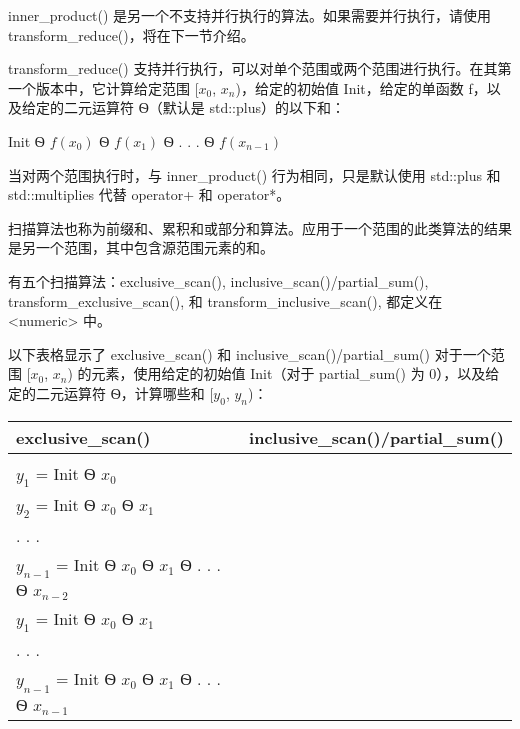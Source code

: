 inner\_product() 是另一个不支持并行执行的算法。如果需要并行执行，请使用 transform\_reduce()，将在下一节介绍。


transform\_reduce() 支持并行执行，可以对单个范围或两个范围进行执行。在其第一个版本中，它计算给定范围 [$x_0$, $x_n$)，给定的初始值 Init，给定的单函数 f，以及给定的二元运算符 Ѳ（默认是 std::plus）的以下和：

Init Ѳ $f(x_0)$ Ѳ $f(x_1)$ Ѳ . . . Ѳ $f(x_{n−1})$

当对两个范围执行时，与 inner\_product() 行为相同，只是默认使用 std::plus 和 std::multiplies 代替 operator+ 和 operator*。


扫描算法也称为前缀和、累积和或部分和算法。应用于一个范围的此类算法的结果是另一个范围，其中包含源范围元素的和。

有五个扫描算法：exclusive\_scan(), inclusive\_scan()/partial\_sum(), transform\_exclusive\_scan(), 和 transform\_inclusive\_scan(), 都定义在 <numeric> 中。

以下表格显示了 exclusive\_scan() 和 inclusive\_scan()/partial\_sum() 对于一个范围 [$x_0$, $x_n$) 的元素，使用给定的初始值 Init（对于 partial\_sum() 为 0），以及给定的二元运算符 Ѳ，计算哪些和 [$y_0$, $y_n$)：

\begin{longtable}{|l|l|}
\hline
\textbf{exclusive\_scan()} &
\textbf{inclusive\_scan()/partial\_sum()} \\ \hline
\endfirsthead
%
\endhead
%
\begin{tabular}[c]{@{}l@{}}$y_0$ = Init\\ $y_1$ = Init Ѳ $x_0$\\ $y_2$ = Init Ѳ $x_0$ Ѳ $x_1$\\ . . .\\ $y_{n-1}$ = Init Ѳ $x_0$ Ѳ $x_1$ Ѳ . . . Ѳ $x_{n-2}$\end{tabular} &
\begin{tabular}[c]{@{}l@{}}$y_0$ = Init Ѳ $x_0$\\ $y_1$ = Init Ѳ $x_0$ Ѳ $x_1$\\ . . .\\ $y_{n-1}$ = Init Ѳ $x_0$ Ѳ $x_1$ Ѳ . . . Ѳ $x_{n-1}$\end{tabular} \\ \hline
\end{longtable}

